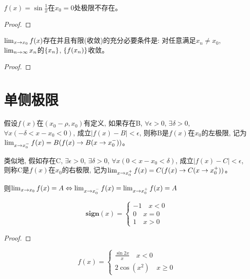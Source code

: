 \documentclass[lang=cn]{elegantbook}
\begin{document}
\begin{proposition}
    $f(x) = \sin \frac{1}{x}$在$x_0 = 0$处极限不存在。
\end{proposition}
\begin{proof}
    
\end{proof}

\begin{lemma}
    $\lim_{x \to x_0 } f(x)$存在并且有限(收敛)的充分必要条件是: 对任意满足$x_n \neq x_0$, $\lim_{n \to \infty } x_n$的$\left\{ x_n\right\}$, $\left\{ f(x_n)\right\}$收敛。
\end{lemma}
\begin{proof}
    
\end{proof}

\section{单侧极限}
\begin{definition}
    假设$f(x)$在$(x_0 - \rho, x_0)$有定义, 如果存在B, $\forall \epsilon > 0$, $\exists \delta > 0$, $\forall x(-\delta < x-x_0 < 0)$, 成立$\left| f(x) - B\right| < \epsilon$, 则称B是$f(x)$在$x_0$的左极限, 记为$\lim_{x \to x_0^- } f(x) = B(f(x)\to B(x \to x_0^-))$。

    类似地, 假如存在C, $\exists \epsilon > 0$, $\exists \delta > 0$, $\forall x(0 < x - x_0 < \delta )$, 成立$\left| f(x) - C \right| < \epsilon$, 则称C是$f(x)$在$x_0$的右极限, 记为$\lim_{x \to x_0^+ } f(x) = C(f(x)\to C(x \to x_0^+))$。

    则$\lim_{x \to x_0 } f(x) = A \Leftrightarrow \lim_{x \to x_0^- } f(x) = \lim_{x \to x_0^+ } f(x) = A$
\end{definition}

\begin{proposition}
    \begin{equation*}
        \mathbf{sign} (x) = \left\{ 
            \begin{aligned}
                -1 \quad x < 0 \\
                0 \quad x = 0 \\
                1 \quad x > 0 
            \end{aligned}
        \right.
    \end{equation*}
\end{proposition}
\begin{proof}
    
\end{proof}
\begin{proposition}
    \begin{equation*}
        f(x) = \left\{
            \begin{aligned}
               \frac{\sin 2x}{x} \quad x < 0 \\
               2\cos(x^2) \quad x \ge 0 
            \end{aligned}
        \right.
    \end{equation*}
\end{proposition}
\end{document}
